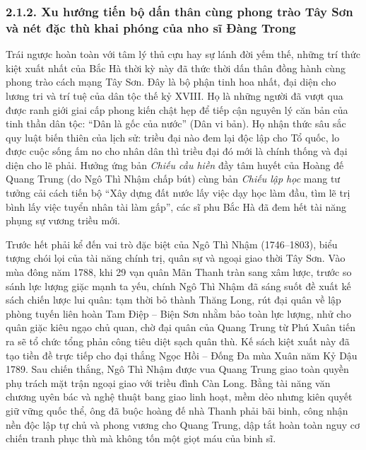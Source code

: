 \subsubsection*{2.1.2. Xu hướng tiến bộ dấn thân cùng phong trào Tây Sơn và nét đặc thù khai phóng của nho sĩ Đàng Trong}

Trái ngược hoàn toàn với tâm lý thủ cựu hay sự lánh đời yếm thế, những trí thức kiệt xuất nhất của Bắc Hà thời kỳ này đã thức thời dấn thân đồng hành cùng phong trào cách mạng Tây Sơn. Đây là bộ phận tinh hoa nhất, đại diện cho lương tri và trí tuệ của dân tộc thế kỷ XVIII. Họ là những người đã vượt qua được ranh giới giai cấp phong kiến chật hẹp để tiếp cận nguyên lý căn bản của tinh thần dân tộc: ``Dân là gốc của nước'' (Dân vi bản). Họ nhận thức sâu sắc quy luật biến thiên của lịch sử: triều đại nào đem lại độc lập cho Tổ quốc, lo được cuộc sống ấm no cho nhân dân thì triều đại đó mới là chính thống và đại diện cho lẽ phải. Hưởng ứng bản \textit{Chiếu cầu hiền} đầy tâm huyết của Hoàng đế Quang Trung (do Ngô Thì Nhậm chấp bút) cùng bản \textit{Chiếu lập học} mang tư tưởng cải cách tiến bộ ``Xây dựng đất nước lấy việc dạy học làm đầu, tìm lẽ trị bình lấy việc tuyển nhân tài làm gấp'', các sĩ phu Bắc Hà đã đem hết tài năng phụng sự vương triều mới.

Trước hết phải kể đến vai trò đặc biệt của Ngô Thì Nhậm (1746--1803), biểu tượng chói lọi của tài năng chính trị, quân sự và ngoại giao thời Tây Sơn. Vào mùa đông năm 1788, khi 29 vạn quân Mãn Thanh tràn sang xâm lược, trước so sánh lực lượng giặc mạnh ta yếu, chính Ngô Thì Nhậm đã sáng suốt đề xuất kế sách chiến lược lui quân: tạm thời bỏ thành Thăng Long, rút đại quân về lập phòng tuyến liên hoàn Tam Điệp -- Biện Sơn nhằm bảo toàn lực lượng, nhử cho quân giặc kiêu ngạo chủ quan, chờ đại quân của Quang Trung từ Phú Xuân tiến ra sẽ tổ chức tổng phản công tiêu diệt sạch quân thù. Kế sách kiệt xuất này đã tạo tiền đề trực tiếp cho đại thắng Ngọc Hồi -- Đống Đa mùa Xuân năm Kỷ Dậu 1789. Sau chiến thắng, Ngô Thì Nhậm được vua Quang Trung giao toàn quyền phụ trách mặt trận ngoại giao với triều đình Càn Long. Bằng tài năng văn chương uyên bác và nghệ thuật bang giao linh hoạt, mềm dẻo nhưng kiên quyết giữ vững quốc thể, ông đã buộc hoàng đế nhà Thanh phải bãi binh, công nhận nền độc lập tự chủ và phong vương cho Quang Trung, dập tắt hoàn toàn nguy cơ chiến tranh phục thù mà không tốn một giọt máu của binh sĩ.

